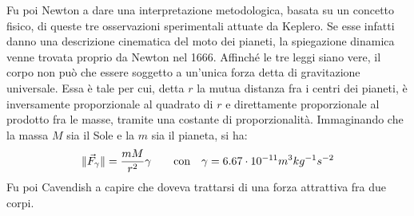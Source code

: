 \documentclass[10pt,a4paper]{book}
\DeclarePairedDelimiter{\norma}{\lVert}{\rVert} %
\begin{document}
Fu poi Newton a dare una interpretazione metodologica, basata su un concetto fisico, di queste tre osservazioni sperimentali attuate da Keplero. Se esse infatti danno una descrizione cinematica del moto dei pianeti, la spiegazione dinamica venne trovata proprio da Newton nel 1666. Affinché le tre leggi siano vere, il corpo non può che essere soggetto a un'unica forza detta di gravitazione universale. Essa è tale per cui, detta $r$ la mutua distanza fra i centri dei pianeti,  è inversamente proporzionale al quadrato di $r$ e direttamente proporzionale al prodotto fra le masse, tramite una costante di proporzionalità. Immaginando che la massa $M$ sia il Sole e la $m$ sia il pianeta, si ha:
\[
	\norma{\vec{F}_\gamma}=\frac{mM}{r^2}\gamma \qquad \text{con} \quad\gamma=6.67 \cdot 10^{-11} m^3 kg^{-1} s^{-2}
\]
Fu poi Cavendish a capire che doveva trattarsi di una forza attrattiva fra due corpi.
\end{document}
